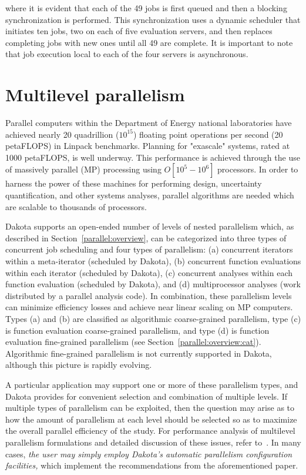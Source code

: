 where it is evident that each of the 49 jobs is first queued and then
a blocking synchronization is performed.  This synchronization uses a
dynamic scheduler that initiates ten jobs, two on each of five evaluation
servers, and then replaces completing jobs with new
ones until all 49 are complete.  It is important to note that job
execution local to each of the four servers is asynchronous.

\section{Multilevel parallelism} \label{parallel:MLP}


Parallel computers within the Department of Energy national
laboratories have achieved nearly 20 quadrillion ($10^{15}$) floating point
operations per second (20 petaFLOPS) in Linpack benchmarks. Planning
for "exascale" systems, rated at 1000 petaFLOPS, is well underway. 
This performance is achieved through the use of massively parallel (MP)
processing using $O[10^{5}-10^{6}]$ processors. In order to harness
the power of these machines for performing design, uncertainty
quantification, and other systems analyses, parallel algorithms are
needed which are scalable to thousands of processors.

Dakota supports an open-ended number of levels of nested parallelism
which, as described in Section~\ref{parallel:overview}, can be
categorized into three types of concurrent job scheduling and four
types of parallelism: (a) concurrent iterators within a meta-iterator
(scheduled by Dakota), (b) concurrent function evaluations within each
iterator (scheduled by Dakota), (c) concurrent analyses within each
function evaluation (scheduled by Dakota), and (d) multiprocessor
analyses (work distributed by a parallel analysis code).  In
combination, these parallelism levels can minimize efficiency losses
and achieve near linear scaling on MP computers.  Types (a) and (b)
are classified as algorithmic coarse-grained parallelism, type (c) is
function evaluation coarse-grained parallelism, and type (d) is
function evaluation fine-grained parallelism (see
Section~\ref{parallel:overview:cat}). Algorithmic fine-grained
parallelism is not currently supported in Dakota, although this 
picture is rapidly evolving. 

A particular application may support one or more of these parallelism
types, and Dakota provides for convenient selection and combination of
multiple levels. If multiple types of parallelism can be exploited,
then the question may arise as to how the amount of parallelism at
each level should be selected so as to maximize the overall parallel
efficiency of the study. For performance analysis of multilevel
parallelism formulations and detailed discussion of these issues,
refer to~\cite{Eld00}.  In many cases, \emph{the user may simply
  employ Dakota's automatic parallelism configuration facilities,}
which implement the recommendations from the aforementioned paper.

